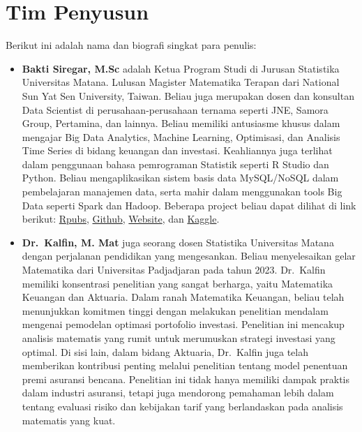 \documentclass[
]{book}
\providecommand{\tightlist}{%
  \setlength{\itemsep}{0pt}\setlength{\parskip}{0pt}}
\theoremstyle{definition}
\theoremstyle{definition}
\theoremstyle{definition}
\theoremstyle{definition}
\theoremstyle{remark}
\begin{document}
\hypertarget{tim-penyusun}{%
\section*{Tim Penyusun}\label{tim-penyusun}}

Berikut ini adalah nama dan biografi singkat para penulis:

\begin{itemize}
\tightlist
\item
  \textbf{Bakti Siregar, M.Sc} adalah Ketua Program Studi di Jurusan Statistika Universitas Matana. Lulusan Magister Matematika Terapan dari National Sun Yat Sen University, Taiwan. Beliau juga merupakan dosen dan konsultan Data Scientist di perusahaan-perusahaan ternama seperti JNE, Samora Group, Pertamina, dan lainnya. Beliau memiliki antusiasme khusus dalam mengajar Big Data Analytics, Machine Learning, Optimisasi, dan Analisis Time Series di bidang keuangan dan investasi. Keahliannya juga terlihat dalam penggunaan bahasa pemrograman Statistik seperti R Studio dan Python. Beliau mengaplikasikan sistem basis data MySQL/NoSQL dalam pembelajaran manajemen data, serta mahir dalam menggunakan tools Big Data seperti Spark dan Hadoop. Beberapa project beliau dapat dilihat di link berikut: \href{https://rpubs.com/dsciencelabs}{Rpubs}, \href{https://github.com/dsciencelabs}{Github}, \href{https://dsciencelabs.github.io/web/index.html}{Website}, dan \href{https://www.kaggle.com/baktisiregar/code}{Kaggle}.
\end{itemize}

\begin{itemize}
\tightlist
\item
  \textbf{Dr.~Kalfin, M. Mat} juga seorang dosen Statistika Universitas Matana dengan perjalanan pendidikan yang mengesankan. Beliau menyelesaikan gelar Matematika dari Universitas Padjadjaran pada tahun 2023. Dr.~Kalfin memiliki konsentrasi penelitian yang sangat berharga, yaitu Matematika Keuangan dan Aktuaria. Dalam ranah Matematika Keuangan, beliau telah menunjukkan komitmen tinggi dengan melakukan penelitian mendalam mengenai pemodelan optimasi portofolio investasi. Penelitian ini mencakup analisis matematis yang rumit untuk merumuskan strategi investasi yang optimal. Di sisi lain, dalam bidang Aktuaria, Dr.~Kalfin juga telah memberikan kontribusi penting melalui penelitian tentang model penentuan premi asuransi bencana. Penelitian ini tidak hanya memiliki dampak praktis dalam industri asuransi, tetapi juga mendorong pemahaman lebih dalam tentang evaluasi risiko dan kebijakan tarif yang berlandaskan pada analisis matematis yang kuat.
\end{itemize}
\end{document}
